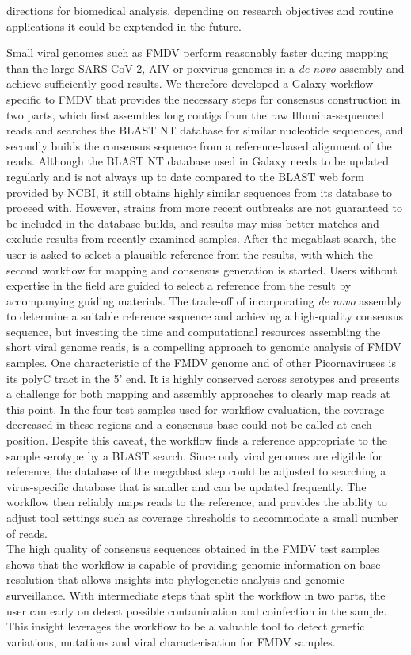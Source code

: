 directions for biomedical analysis, depending on research objectives and routine applications it could be exptended in the future. 

Small viral genomes such as \ac{FMDV} perform reasonably faster during mapping than the large \ac{SARS-CoV-2}, \ac{AIV} or poxvirus genomes in a \textit{de novo} assembly and achieve sufficiently good results. We therefore developed a Galaxy workflow specific to \ac{FMDV} that provides the necessary steps for consensus construction in two parts, which first assembles long contigs from the raw Illumina-sequenced reads and searches the \ac{BLAST} NT database for similar nucleotide sequences, and secondly builds the consensus sequence from a reference-based alignment of the reads. Although the \ac{BLAST} NT database used in Galaxy needs to be updated regularly and is not always up to date compared to the \ac{BLAST} web form provided by \ac{NCBI}, it still obtains highly similar sequences from its database to proceed with. However, strains from more recent outbreaks are not guaranteed to be included in the database builds, and results may miss better matches and exclude results from recently examined samples. After the megablast search, the user is asked to select a plausible reference from the results, with which the second workflow for mapping and consensus generation is started. Users without expertise in the field are guided to select a reference from the result by accompanying guiding materials. The trade-off of incorporating \textit{de novo} assembly to determine a suitable reference sequence and achieving a high-quality consensus sequence, but investing the time and computational resources assembling the short viral genome reads, is a compelling approach to genomic analysis of \ac{FMDV} samples. One characteristic of the \ac{FMDV} genome and of other Picornaviruses is its polyC tract in the 5' end. It is highly conserved across serotypes and presents a challenge for both mapping and assembly approaches to clearly map reads at this point. In the four test samples used for workflow evaluation, the coverage decreased in these regions and a consensus base could not be called at each position. Despite this caveat, the workflow finds a reference appropriate to the sample serotype by a \ac{BLAST} search. Since only viral genomes are eligible for reference, the database of the megablast step could be adjusted to searching a virus-specific database that is smaller and can be updated frequently. The workflow then reliably maps reads to the reference, and provides the ability to adjust tool settings such as coverage thresholds to accommodate a small number of reads.\\
The high quality of consensus sequences obtained in the \ac{FMDV} test samples shows that the workflow is capable of providing genomic information on base resolution that allows insights into phylogenetic analysis and genomic surveillance. With intermediate steps that split the workflow in two parts, the user can early on detect possible contamination and coinfection in the sample. This insight leverages the workflow to be a valuable tool to detect genetic variations, mutations and viral characterisation for \ac{FMDV} samples.

